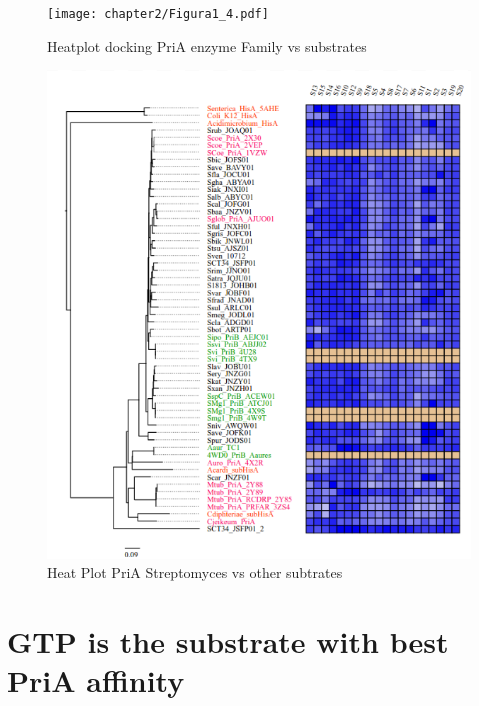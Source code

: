 \documentclass[12pt,twoside]{reedthesis}
\begin{document}
  \begin{figure}[h!tbp]
  \centering
  \texttt{[image: chapter2/Figura1\_4.pdf]}
  \caption[Heatplot docking PriA enzyme Family vs substrates]{\normalsize{Heatplot docking PriA enzyme Family vs substrates}}
  \label{fig:Heatplod PriA docking}
  \end{figure}
  
  \begin{figure}[h!tbp]
  \centering
  \includegraphics[angle = 0,scale = 0.6]{chapter2/PriAHeatPot.png}
  \caption[Heat Plot PriA Streptomyces vs other subtrates]{\normalsize{Heat Plot PriA Streptomyces vs other subtrates}}
  \label{fig:PriADocking}
  \end{figure}
  
  \section{GTP is the substrate with best PriA
  affinity}\label{gtp-is-the-substrate-with-best-pria-affinity}
  
\end{document}
